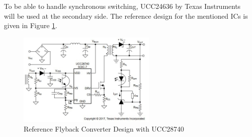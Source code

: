 To be able to handle synchronous switching, UCC24636 by Texas Instruments will be used at the secondary side. The reference design for the mentioned ICs is given in Figure \ref{fig:refdesign}.

\begin{figure}[H]
\begin{center}
\includegraphics[width=0.6\textwidth]{refdesign.jpg}
\caption{Reference Flyback Converter Design with UCC28740}
\label{fig:refdesign}
\end{center}
\end{figure}


